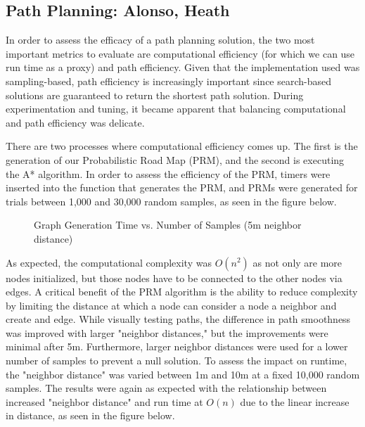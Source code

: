 \documentclass{article}
\begin{document}
\subsection{Path Planning: Alonso, Heath}

In order to assess the efficacy of a path planning solution, the two most important metrics to evaluate are computational efficiency (for which we can use run time as a proxy) and path efficiency. Given that the implementation used was sampling-based, path efficiency is increasingly important since search-based solutions are guaranteed to return the shortest path solution. During experimentation and tuning, it became apparent that balancing computational and path efficiency was delicate. 

There are two processes where computational efficiency comes up. The first is the generation of our Probabilistic Road Map (PRM), and the second is executing the A* algorithm. In order to assess the efficiency of the PRM, timers were inserted into the function that generates the PRM, and PRMs were generated for trials between 1,000 and 30,000 random samples, as seen in the figure below.

\begin{figure}[H]
\centering
{}
\caption{Graph Generation Time vs. Number of Samples  (5m neighbor distance)}
\label{fig:samples_time}
\end{figure}

As expected, the computational complexity was $O(n^2)$ as not only are more nodes initialized, but those nodes have to be connected to the other nodes via edges. A critical benefit of the PRM algorithm is the ability to reduce complexity by limiting the distance at which a node can consider a node a neighbor and create and edge. While visually testing paths, the difference in path smoothness was improved with larger "neighbor distances," but the improvements were minimal after 5m. Furthermore, larger neighbor distances were used for a lower number of samples to prevent a null solution. To assess the impact on runtime, the "neighbor distance" was varied between 1m and 10m at a fixed 10,000 random samples. The results were again as expected with the relationship between increased "neighbor distance" and run time at $O(n)$ due to the linear increase in distance, as seen in the figure below.
\end{document}
